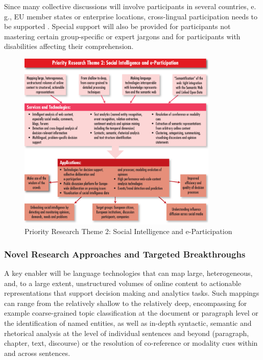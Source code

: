 \documentclass[10pt, plain]{../../metanetpaper}
\begin{document}
\begin{multicols}{2}
Since many collective discussions will involve participants in several countries, e.\,g., EU member states or enterprise locations, cross-lingual participation needs to be supported \cite{ombudsman2012}. Special support will also be provided for participants not mastering certain group-specific or expert jargons and for participants with disabilities affecting their comprehension.

\begin{figure}[htb]
  \center
  \includegraphics[width=0.85\textwidth]{../_media/PT2}
  \caption{Priority Research Theme 2: Social Intelligence and e-Participation}
  \label{fig:pt1-overview}
\end{figure}

\subsubsection{Novel Research Approaches and Targeted Breakthroughs}
\label{sec:novel-rese-appr-pt2}

A key enabler will be language technologies that can map large, heterogeneous, and, to a large extent, unstructured volumes of online content to actionable representations that support decision making and analytics tasks. Such mappings can range from the relatively shallow to the relatively deep, encompassing for example coarse-grained topic classification at the document or paragraph level or the identification of named entities, as well as in-depth syntactic, semantic and rhetorical analysis at the level of individual sentences and beyond (paragraph, chapter, text, discourse) or the resolution of co-reference or modality cues within and across sentences.


\end{multicols}
\end{document}
